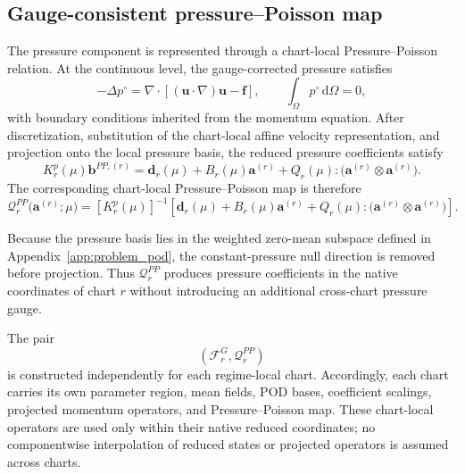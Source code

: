 \documentclass{article}
\begin{document}
\subsection{Gauge-consistent pressure--Poisson map}

The pressure component is represented through a chart-local
Pressure--Poisson relation.
At the continuous level, the gauge-corrected pressure satisfies
\begin{equation}
    -\Delta p^\circ
    =
    \nabla\!\cdot
    \left[
        (\bm u\!\cdot\!\nabla)\bm u
        -
        \bm f
    \right],
    \qquad
    \int_\Omega p^\circ\,\mathrm d\Omega=0,
    \label{eq:app_continuous_pressure_poisson}
\end{equation}
with boundary conditions inherited from the momentum equation.
After discretization, substitution of the chart-local affine velocity
representation, and projection onto the local pressure basis, the reduced
pressure coefficients satisfy
\begin{equation}
    K_r^p(\mu)\bm b^{PP,(r)}
    =
    \bm d_r(\mu)
    +
    B_r(\mu)\bm a^{(r)}
    +
    Q_r(\mu):
    \bigl(
        \bm a^{(r)}\otimes\bm a^{(r)}
    \bigr).
    \label{eq:app_pressure_poisson_system}
\end{equation}
The corresponding chart-local Pressure--Poisson map is therefore
\begin{equation}
    \mathcal Q_r^{PP}
    \bigl(
        \bm a^{(r)};
        \mu
    \bigr)
    =
    [K_r^p(\mu)]^{-1}
    \left[
        \bm d_r(\mu)
        +
        B_r(\mu)\bm a^{(r)}
        +
        Q_r(\mu):
        \bigl(
            \bm a^{(r)}\otimes\bm a^{(r)}
        \bigr)
    \right].
    \label{eq:app_pressure_poisson_map}
\end{equation}

Because the pressure basis lies in the weighted zero-mean subspace defined in
Appendix~\ref{app:problem_pod}, the constant-pressure null direction is
removed before projection.
Thus $\mathcal Q_r^{PP}$ produces pressure coefficients in the native
coordinates of chart $r$ without introducing an additional cross-chart
pressure gauge.

The pair
\begin{equation}
    \left(
        \mathcal F_r^G,
        \mathcal Q_r^{PP}
    \right)
\end{equation}
is constructed independently for each regime-local chart.
Accordingly, each chart carries its own parameter region, mean fields,
POD bases, coefficient scalings, projected momentum operators, and
Pressure--Poisson map.
These chart-local operators are used only within their native reduced
coordinates; no componentwise interpolation of reduced states or projected
operators is assumed across charts.
\end{document}
